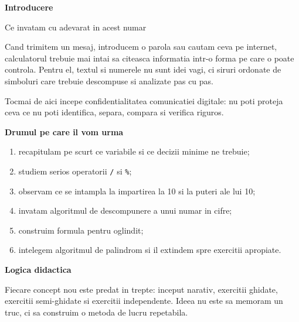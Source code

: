 \pagecolor{white}
\color{black}
\thispagestyle{empty}
\begin{center}
{\Huge\bfseries Introducere}\par
\vspace{0.7em}
{\Large Ce invatam cu adevarat in acest numar}
\end{center}

\vspace{1.0em}

\begin{tcolorbox}[colback=white,colframe=black!60,boxrule=0.8pt,arc=1.5mm]
\small
Cand trimitem un mesaj, introducem o parola sau cautam ceva pe internet, calculatorul trebuie mai intai sa citeasca informatia intr-o forma pe care o poate controla. Pentru el, textul si numerele nu sunt idei vagi, ci siruri ordonate de simboluri care trebuie descompuse si analizate pas cu pas.

Tocmai de aici incepe confidentialitatea comunicatiei digitale: nu poti proteja ceva ce nu poti identifica, separa, compara si verifica riguros.
\end{tcolorbox}

\begin{tcolorbox}[colback=white,colframe=black!60,boxrule=0.8pt,arc=1.5mm]
\small
\textbf{Drumul pe care il vom urma}
\begin{enumerate}
\item recapitulam pe scurt ce variabile si ce decizii minime ne trebuie;
\item studiem serios operatorii \texttt{/} si \texttt{\%};
\item observam ce se intampla la impartirea la 10 si la puteri ale lui 10;
\item invatam algoritmul de descompunere a unui numar in cifre;
\item construim formula pentru oglindit;
\item intelegem algoritmul de palindrom si il extindem spre exercitii apropiate.
\end{enumerate}
\end{tcolorbox}

\begin{tcolorbox}[colback=white,colframe=black!60,boxrule=0.8pt,arc=1.5mm]
\small
\textbf{Logica didactica}

Fiecare concept nou este predat in trepte: inceput narativ, exercitii ghidate, exercitii semi-ghidate si exercitii independente. Ideea nu este sa memoram un truc, ci sa construim o metoda de lucru repetabila.
\end{tcolorbox}
\clearpage


